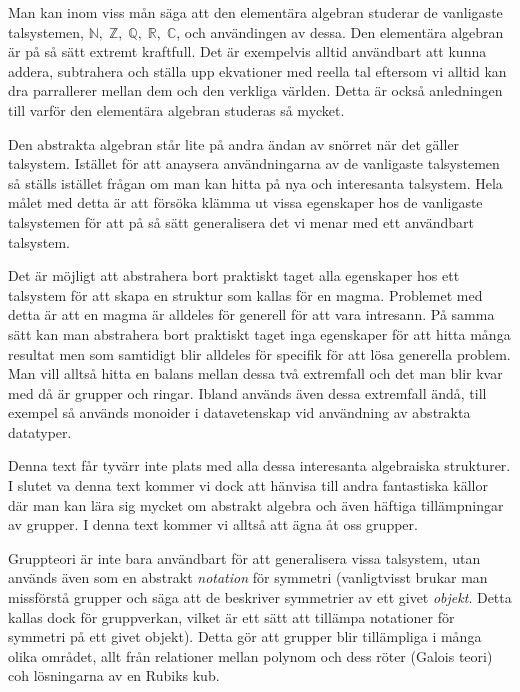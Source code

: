 \documentclass{article}
\theoremstyle{definition}
\begin{document}
Man kan inom viss mån säga att den elementära algebran studerar de 
vanligaste talsystemen, $\mathbb{N}, \; \mathbb{Z}, \; \mathbb{Q}, \; \mathbb{R}, \; \mathbb{C}$,
och användingen av dessa.
Den elementära algebran är på så sätt 
extremt kraftfull. Det är exempelvis alltid användbart att kunna addera, subtrahera och 
ställa upp ekvationer 
med reella tal eftersom vi alltid kan dra parrallerer mellan dem
och den verkliga världen. Detta är också anledningen till varför den elementära algebran
studeras så mycket. 

Den abstrakta algebran står lite på andra ändan av snörret när det gäller 
talsystem. Istället för att anaysera användningarna av de vanligaste talsystemen så 
ställs istället frågan om man kan hitta på nya och interesanta talsystem. Hela målet med detta är att försöka klämma ut vissa egenskaper hos de vanligaste 
talsystemen för att på så sätt generalisera det vi menar med ett användbart talsystem.

Det är möjligt att abstrahera bort praktiskt taget alla egenskaper hos ett talsystem för att skapa en struktur som kallas för en magma. Problemet med detta är att en
magma är alldeles för generell för att vara intresann. På samma sätt kan man abstrahera bort praktiskt taget inga egenskaper för att hitta
många resultat men som samtidigt blir alldeles för specifik för att lösa generella problem. Man vill alltså hitta en balans mellan dessa två extremfall och det man blir kvar med då är grupper och 
ringar. Ibland används även dessa extremfall ändå, till exempel så används monoider i datavetenskap vid användning av abstrakta datatyper. 

Denna text får tyvärr inte plats med alla dessa interesanta algebraiska strukturer. I slutet va denna text kommer vi dock att hänvisa till andra fantastiska källor där man
kan lära sig mycket om abstrakt algebra och även häftiga tillämpningar av grupper. I denna text kommer vi alltså att ägna åt oss grupper. 

Gruppteori är inte bara användbart för att generalisera vissa talsystem, utan används även som en abstrakt \textit{notation} för symmetri (vanligtvisst brukar man 
missförstå grupper och säga att de beskriver symmetrier av ett givet \textit{objekt}. Detta kallas dock för gruppverkan, vilket är ett sätt att tillämpa notationer för symmetri på ett givet objekt).
Detta gör att grupper blir tillämpliga i många olika området, allt från relationer mellan polynom och dess röter (Galois teori) coh lösningarna av en Rubiks kub.
\end{document}
